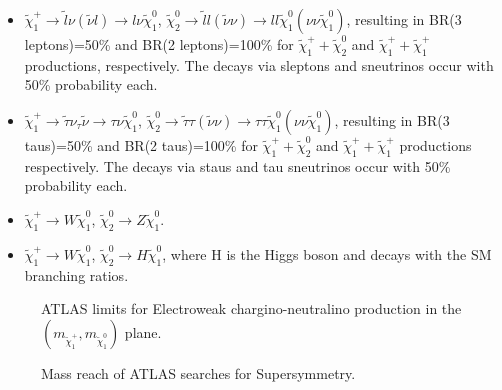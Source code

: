 \begin{itemize}

\item $\tilde{\chi}^+_1 \rightarrow \tilde{l} \nu (\tilde{\nu} l ) \rightarrow l \nu \tilde{\chi}^0_1 $, $\tilde{\chi}^0_2  \rightarrow \tilde{l} l (\tilde{\nu} \nu ) \rightarrow l l \tilde{\chi}^0_1 ( \nu \nu \tilde{\chi}^0_1  )$, resulting in BR(3 leptons)=50\% and BR(2 leptons)=100\% for $\tilde{\chi}^+_1 + \tilde{\chi}^0_2$ and $\tilde{\chi}^+_1 + \tilde{\chi}^+_1$ productions, respectively. The decays via sleptons and sneutrinos occur with 50\% probability each. 

\item $\tilde{\chi}^+_1 \rightarrow \tilde{\tau} \nu_{\tau} \tilde{\nu} \rightarrow \tau \nu \tilde{\chi}^0_1$,  $\tilde{\chi}^0_2  \rightarrow \tilde{\tau} \tau ( \tilde{\nu} \nu ) \rightarrow \tau \tau \tilde{\chi}^0_1 ( \nu \nu \tilde{\chi}^0_1   ) $, resulting in BR(3 taus)=50\% and BR(2 taus)=100\% for $\tilde{\chi}^+_1 + \tilde{\chi}^0_2$ and $\tilde{\chi}^+_1 + \tilde{\chi}^+_1$ productions respectively. The decays via staus and tau sneutrinos occur with 50\% probability each. 

\item $\tilde{\chi}^+_1 \rightarrow W  \tilde{\chi}^0_1$, $\tilde{\chi}^0_2  \rightarrow Z \tilde{\chi}^0_1$.

\item $\tilde{\chi}^+_1 \rightarrow W  \tilde{\chi}^0_1$, $\tilde{\chi}^0_2  \rightarrow H \tilde{\chi}^0_1$, where H is the Higgs boson and decays with the SM branching ratios.

\end{itemize}

\begin{figure}[htbp]
\begin{center}
\end{center}
\caption[ATLAS Electroweak chargino-neutralino production limits]{ATLAS limits for Electroweak chargino-neutralino production in the $\left( m_{\tilde{\chi}^+_1}, m_{\tilde{\chi}^0_1}  \right)$ plane.}
\label{fig:ATLASewlimits}
\end{figure}

\begin{figure}[p]
\begin{center}
\end{center}
\caption[Mass reach of ATLAS searches for Supersymmetry]{Mass reach of ATLAS searches for Supersymmetry.}
\label{fig:SUSYlimits}
\end{figure}








